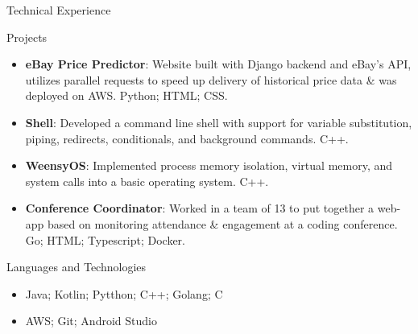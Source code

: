 \documentclass[]{mcdowellcv}
\begin{document}
	\begin{cvsection}{Technical Experience}
		\begin{cvsubsection}{Projects}{}{}
			\begin{itemize}
				\item \textbf{eBay Price Predictor}: Website built with Django backend and eBay's API, utilizes parallel requests to speed up delivery of historical price data \& was deployed on AWS. Python; HTML; CSS.
				\item \textbf{Shell}: Developed a command line shell with support for variable substitution, piping, redirects, conditionals, and background commands. C++.
				\item \textbf{WeensyOS}: Implemented process memory isolation, virtual memory, and system calls into a basic operating system. C++.
				\item \textbf{Conference Coordinator}: Worked in a team of 13 to put together a web-app based on monitoring attendance \& engagement at a coding conference. Go; HTML; Typescript; Docker.
			\end{itemize}
		\end{cvsubsection}
	\end{cvsection}
	
	\begin{cvsection}{Languages and Technologies}
		\begin{cvsubsection}{}{}{}	
			\begin{itemize}
				\item Java; Kotlin; Pytthon; C++; Golang; C
				\item AWS; Git; Android Studio
			\end{itemize}
		\end{cvsubsection}
	\end{cvsection}

		
\end{document}

